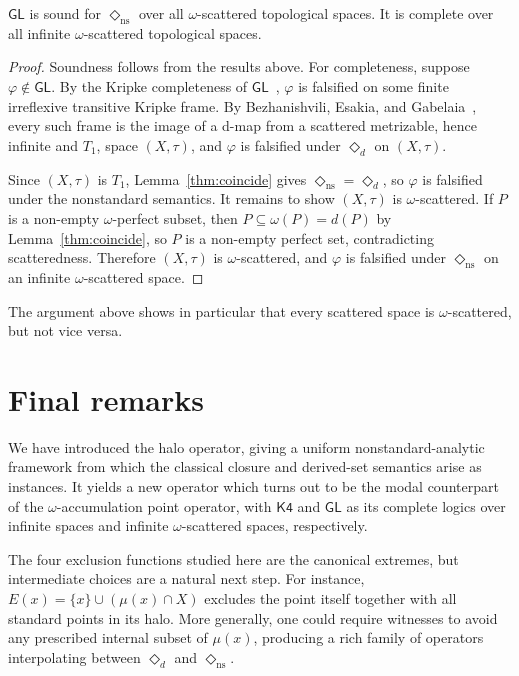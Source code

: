 \documentclass[submission,copyright,creativecommons]{eptcs}
\newcommand{\diam}{\Diamond}
\newcommand{\lozengens}{\diam_\mathrm{ns}}
\begin{document}
\begin{theorem}
\label{cor:GLcomplete}
$\mathsf{GL}$ is sound for $\lozengens$ over all $\omega$-scattered topological spaces. 
It is complete over all infinite $\omega$-scattered topological spaces. 
\end{theorem}

\begin{proof}
Soundness follows from the results above.
For completeness, suppose $\varphi \notin \mathsf{GL}$.
By the Kripke completeness of $\mathsf{GL}$~\cite{segerberg}, $\varphi$ 
is falsified on some finite irreflexive transitive Kripke frame.
By Bezhanishvili, Esakia, and Gabelaia~\cite{BEG2005,BEG2010}, every such frame 
is the image of a d-map from a scattered metrizable, hence infinite and 
$T_1$, space $(X,\tau)$, and $\varphi$ is falsified under $\diam_d$ 
on $(X,\tau)$.

Since $(X,\tau)$ is $T_1$, Lemma~\ref{thm:coincide} gives 
$\lozengens = \diam_d$, so $\varphi$ is falsified under the 
nonstandard semantics.
It remains to show $(X,\tau)$ is $\omega$-scattered.
If $P$ is a non-empty $\omega$-perfect subset, then $P\subseteq \omega(P)=d(P)$ by Lemma~\ref{thm:coincide}, so $P$ is a non-empty perfect set, contradicting scatteredness.
Therefore $(X,\tau)$ is $\omega$-scattered, and $\varphi$ is falsified under $\lozengens$ on an infinite $\omega$-scattered space.
\end{proof}
The argument above shows in particular that every scattered space is $\omega$-scattered, but not vice versa.


\section{Final remarks}

We have introduced the halo operator, giving a uniform nonstandard-analytic framework from which the classical closure and derived-set semantics arise as instances. 
It yields a new operator which turns out to be the modal counterpart of the $\omega$-accumulation point operator, with $\mathsf{K4}$ and $\mathsf{GL}$ as its complete logics over infinite spaces and infinite $\omega$-scattered spaces, respectively.

The four exclusion functions studied here are the canonical extremes, but intermediate choices are a natural next step.
 For instance, $E(x) = \{x\} \cup (\mu(x) \cap X)$ excludes the point itself together with all standard points in its halo.
 More generally, one could require witnesses to avoid any prescribed internal subset of $\mu(x)$, producing a rich family of operators interpolating between $\diam_d$ and $\lozengens$.
\end{document}
